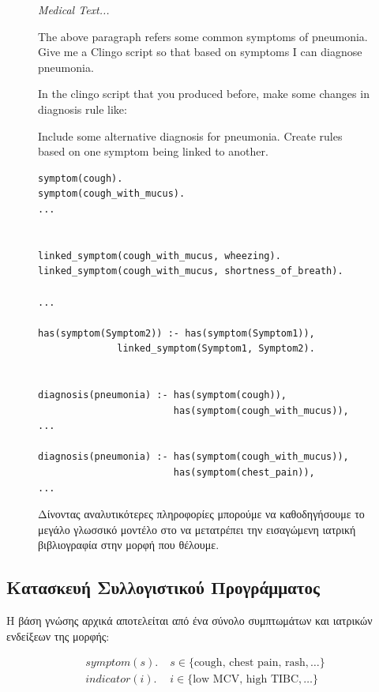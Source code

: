 \documentclass[12pt]{extarticle}
\begin{document}
\begin{figure}[!h]
\begin{prompt}
\textit{Medical Text...}

The above paragraph refers some common symptoms of pneumonia.
Give me a Clingo script so that based on symptoms I can diagnose pneumonia.

In the clingo script that you produced before, make some changes in diagnosis rule like:

Include some alternative diagnosis for pneumonia.
Create rules based on one symptom being linked to another.
\end{prompt}


\begin{commandline}
\scriptsize
\begin{verbatim}
symptom(cough).
symptom(cough_with_mucus).
...


linked_symptom(cough_with_mucus, wheezing).
linked_symptom(cough_with_mucus, shortness_of_breath).

...

has(symptom(Symptom2)) :- has(symptom(Symptom1)), 
              linked_symptom(Symptom1, Symptom2).


diagnosis(pneumonia) :- has(symptom(cough)),
                        has(symptom(cough_with_mucus)),
...

diagnosis(pneumonia) :- has(symptom(cough_with_mucus)),
                        has(symptom(chest_pain)),
...
\end{verbatim}
\end{commandline}
\caption{Δίνοντας αναλυτικότερες πληροφορίες μπορούμε να καθοδηγήσουμε το μεγάλο γλωσσικό μοντέλο στο να μετατρέπει την εισαγώμενη ιατρική βιβλιογραφία στην μορφή που θέλουμε.}
\label{fig:good-prompt}
\end{figure}

\subsection{Κατασκευή Συλλογιστικού Προγράμματος}

Η βάση γνώσης αρχικά αποτελείται από ένα σύνολο συμπτωμάτων και ιατρικών ενδείξεων της μορφής: 

\begin{align}
    symptom(s). & \; s \in \{ \text{cough, chest pain, rash}, \dots \} \\
    indicator(i). & \; i \in \{ \text{low MCV, high TIBC}, \dots \}
\end{align}
\end{document}
